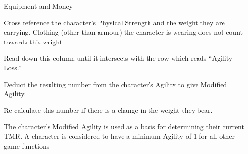 \begin{Chapter}{Equipment and Money}
\begin{Enumerate}
\item Cross reference the character’s Physical Strength and the weight
  they are carrying. Clothing (other than armour) the character is
  wearing does not count towards this weight.

\item Read down this column until it intersects with the row which
  reads “Agility Loss.”

\item Deduct the resulting number from the character’s Agility to give
  Modified Agility.

\item Re-calculate this number if there is a change in the weight they
  bear.

\end{Enumerate}

The character’s Modified Agility is used as a basis for determining
their current TMR.  A character is considered to have a minimum
Agility of 1 for all other game functions.

\end{Chapter}
